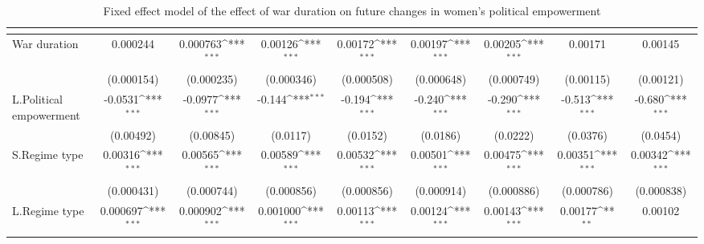 \begin{table}[htbp]\centering
\def\sym#1{\ifmmode^{#1}\else\(^{#1}\)\fi}
\caption{Fixed effect model of the effect of war duration on future changes in women's political empowerment\label{polwardur}}
\begin{tabular}{l*{8}{c}}
\hline\hline
                    &&&&&&&&\\
\hline
War duration        &    0.000244         &    0.000763\sym{***}&     0.00126\sym{***}&     0.00172\sym{***}&     0.00197\sym{***}&     0.00205\sym{***}&     0.00171         &     0.00145         \\
                    &  (0.000154)         &  (0.000235)         &  (0.000346)         &  (0.000508)         &  (0.000648)         &  (0.000749)         &   (0.00115)         &   (0.00121)         \\
[1em]
L.Political empowerment&     -0.0531\sym{***}&     -0.0977\sym{***}&      -0.144\sym{***}&      -0.194\sym{***}&      -0.240\sym{***}&      -0.290\sym{***}&      -0.513\sym{***}&      -0.680\sym{***}\\
                    &   (0.00492)         &   (0.00845)         &    (0.0117)         &    (0.0152)         &    (0.0186)         &    (0.0222)         &    (0.0376)         &    (0.0454)         \\
[1em]
S.Regime type       &     0.00316\sym{***}&     0.00565\sym{***}&     0.00589\sym{***}&     0.00532\sym{***}&     0.00501\sym{***}&     0.00475\sym{***}&     0.00351\sym{***}&     0.00342\sym{***}\\
                    &  (0.000431)         &  (0.000744)         &  (0.000856)         &  (0.000856)         &  (0.000914)         &  (0.000886)         &  (0.000786)         &  (0.000838)         \\
[1em]
L.Regime type       &    0.000697\sym{***}&    0.000902\sym{***}&    0.001000\sym{***}&     0.00113\sym{***}&     0.00124\sym{***}&     0.00143\sym{***}&     0.00177\sym{**} &     0.00102         \\

\end{tabular}
\end{table}
